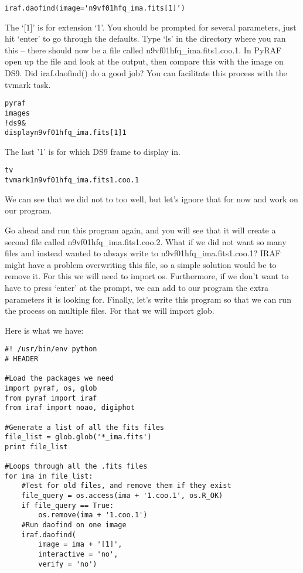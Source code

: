 \begin{verbatim}
iraf.daofind(image='n9vf01hfq_ima.fits[1]')  
\end{verbatim}

The `[1]' is for extension `1'.  You should be prompted for several
parameters, just hit `enter' to go through the defaults.  Type `ls' in
the directory where you ran this -- there should now be a file called
n9vf01hfq\_ima.fits1.coo.1. In PyRAF open up the file and look at the
output, then compare this with the image on DS9.  Did {\sf\small
  iraf.daofind()} do a good job?  You can facilitate this process with
the {\sf\small tvmark} task.

\begin{alltt}
\termtab pyraf  
\pyraftab images 
\pyraftab !ds9 & 
\pyraftab display n9vf01hfq_ima.fits[1] 1
\end{alltt}

The last '1' is for which DS9 frame to display in.

\begin{alltt}
\pyraftab tv  
\pyraftab tvmark 1 n9vf01hfq_ima.fits1.coo.1
\end{alltt}

We can see that we did not to too well, but let's ignore that for now
and work on our program.

Go ahead and run this program again, and you will see that it will
create a second file called n9vf01hfq\_ima.fits1.coo.2. What if we did
not want so many files and instead wanted to always write to
n9vf01hfq\_ima.fits1.coo.1?  IRAF might have a problem overwriting
this file, so a simple solution would be to remove it.  For this we
will need to import {\sf\small os}.  Furthermore, if we don't want to
have to press `enter' at the prompt, we can add to our program the
extra parameters it is looking for.  Finally, let's write this program
so that we can run the process on multiple files.  For that we will
import {\sf\small glob}.

Here is what we have:

\begin{verbatim}
#! /usr/bin/env python
# HEADER

#Load the packages we need 
import pyraf, os, glob  
from pyraf import iraf
from iraf import noao, digiphot
  
#Generate a list of all the fits files
file_list = glob.glob('*_ima.fits') 
print file_list 

#Loops through all the .fits files 
for ima in file_list: 
    #Test for old files, and remove them if they exist
    file_query = os.access(ima + '1.coo.1', os.R_OK)  
    if file_query == True: 
        os.remove(ima + '1.coo.1')  
    #Run daofind on one image  
    iraf.daofind( 
        image = ima + '[1]',  
        interactive = 'no',  
        verify = 'no')  
\end{verbatim}

